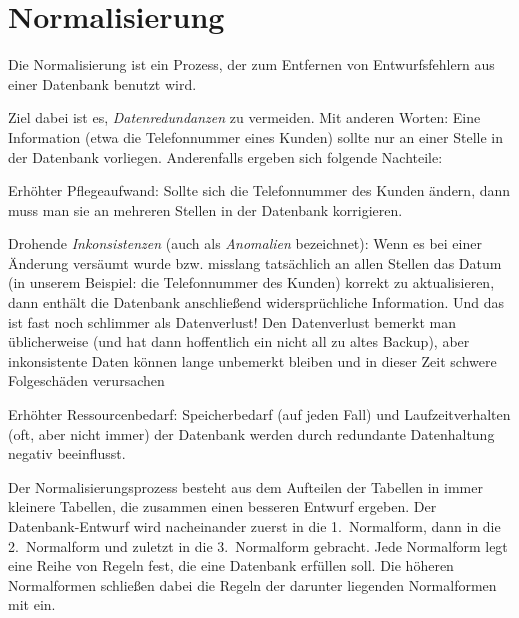 \chapter{Normalisierung}
\renewcommand{\chaptertitle}{Normalisierung}

\lehead[]{\normalfont\sffamily\hspace*{-2.00cm}\textcolor{white}{\colorbox{lightblue}{\makebox[1.60cm][r]{\thechapter}}}\hspace{0.17cm}\textcolor{lightblue}{\chaptertitle}}
\rohead[]{\textcolor{lightblue}{\chaptertitle}\normalfont\sffamily\hspace*{0.17cm}\textcolor{white}{\colorbox{lightblue}{\makebox[1.60cm][l]{\thechapter}}}\hspace{-2.00cm}}
\rehead[]{\textcolor{lightblue}{AvHG, Inf, My}}
\lohead[]{\textcolor{lightblue}{AvHG, Inf, My}}

Die Normalisierung ist ein Prozess, der zum Entfernen von Entwurfsfehlern aus
einer Datenbank benutzt wird. 

Ziel dabei ist es, \emph{Datenredundanzen} zu vermeiden. Mit anderen Worten:
Eine Information (etwa die Telefonnummer eines Kunden) sollte nur an einer Stelle in
der Datenbank vorliegen. Anderenfalls ergeben sich folgende Nachteile:

\begin{compactitem}
\item Erhöhter Pflegeaufwand: Sollte sich die Telefonnummer des Kunden ändern,
dann muss man sie an mehreren Stellen in der Datenbank korrigieren.
\item Drohende \emph{Inkonsistenzen} (auch als \emph{Anomalien} bezeichnet):
Wenn es bei einer Änderung versäumt wurde bzw. misslang tatsächlich an allen
Stellen das Datum (in unserem Beispiel: die Telefonnummer des Kunden) korrekt zu
aktualisieren, dann enthält die Datenbank anschließend widersprüchliche
Information. Und das ist fast noch schlimmer als Datenverlust! Den Datenverlust
bemerkt man üblicherweise (und hat dann hoffentlich ein nicht all zu altes
Backup), aber inkonsistente Daten können lange unbemerkt bleiben und in dieser
Zeit schwere Folgeschäden verursachen
\item Erhöhter Ressourcenbedarf: Speicherbedarf (auf jeden Fall) und
Laufzeitverhalten (oft, aber nicht immer) der Datenbank werden durch redundante
Datenhaltung negativ beeinflusst.
\end{compactitem}

Der Normalisierungsprozess besteht aus dem
Aufteilen der Tabellen in immer kleinere Tabellen, die zusammen einen besseren
Entwurf ergeben. Der Datenbank-Entwurf wird nacheinander zuerst in die
1.~Normalform, dann in die 2.~Normalform und zuletzt in die 3.~Normalform
gebracht. Jede Normalform legt eine Reihe von Regeln fest, die eine Datenbank
erfüllen soll. Die höheren Normalformen schließen dabei die Regeln der darunter
liegenden Normalformen mit ein.


